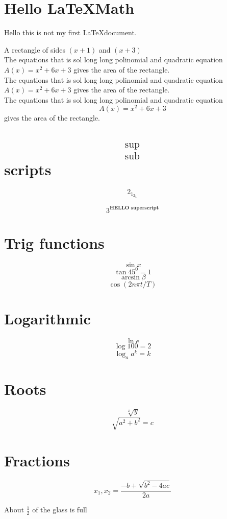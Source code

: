 \documentclass[14pt]{article}
\begin{document}
	\section{Hello \LaTeX Math}
	Hello this is  not  my first \LaTeX document. %
	
	A rectangle of sides $(x + 1)$ and $(x + 3)$\\ %
	The equations that is sol long long polinomial and quadratic equation $A(x) = x^2 + 6x + 3$ gives the area of the rectangle.\\
	The equations that is sol long long polinomial and quadratic equation ${A(x) = x^2 + 6x + 3}$ gives the area of the rectangle.\\
	The equations that is sol long long polinomial and quadratic equation $$A(x) = x^2 + 6x + 3$$ gives the area of the rectangle.
	
	\section{$$^{\text{sup}}_{\text{sub}}$$scripts}
	
	$$2_{1_{2_{3_4}}}$$	
	
	$$3^\textbf{HELLO superscript}$$
	
	\section{Trig functions}
	
	\[\sin x\]
	$$\tan45^0=1$$
	$$\arcsin\beta$$
	$$\cos(2n\pi t/T)$$
	
	\section{Logarithmic}
	
	$$\ln e$$
	$$\log100 = 2$$
	$$\log_a a^k = k$$
	
	\section{Roots}
	
	$$\sqrt[x]{y}$$
	$$\sqrt{a^2+b^2}=c$$
	
	\section{Fractions}
	$$x_1,x_2=\frac{-b+\sqrt{b^2-4ac}}{2a}$$
	
	About $\frac12$ of the glass is full	
		
\end{document}
